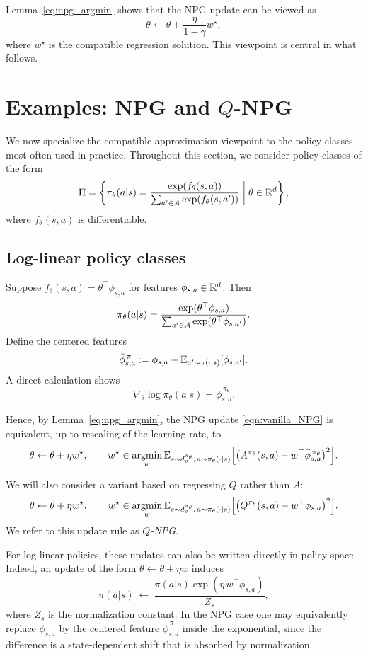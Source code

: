 Lemma~\ref{eq:npg_argmin} shows that the NPG update can be viewed as
\[
\theta \leftarrow \theta + \frac{\eta}{1-\gamma} w^\star,
\]
where $w^\star$ is the compatible regression solution. This viewpoint is central in what
follows.

\section{Examples: NPG and $Q$-NPG}
\label{section:examples}

We now specialize the compatible approximation viewpoint to the policy classes most often
used in practice. Throughout this section, we consider policy classes of the form
\begin{equation}\label{eq:policy_class}
\Pi
=
\left\{
\pi_\theta(a|s)
=
\frac{\exp(f_\theta(s,a))}
{\sum_{a'\in\mathcal{A}}\exp(f_\theta(s,a'))}
\;\middle|\;
\theta\in\mathbb{R}^d
\right\},
\end{equation}
where $f_\theta(s,a)$ is differentiable.

\subsection{Log-linear policy classes}
\label{section:log_linear}

Suppose $f_\theta(s,a)=\theta^\top \phi_{s,a}$ for features $\phi_{s,a}\in\mathbb{R}^d$.
Then
\[
\pi_\theta(a|s)
=
\frac{\exp(\theta^\top \phi_{s,a})}
{\sum_{a'\in\mathcal{A}}\exp(\theta^\top \phi_{s,a'})}.
\]
Define the centered features
\[
\bar \phi_{s,a}^{\,\pi}
:=
\phi_{s,a}-\mathbb{E}_{a'\sim \pi(\cdot|s)}[\phi_{s,a'}].
\]
A direct calculation shows
\[
\nabla_\theta \log \pi_\theta(a|s)=\bar \phi_{s,a}^{\,\pi_\theta}.
\]

Hence, by Lemma~\ref{eq:npg_argmin}, the NPG update
\eqref{eqn:vanilla_NPG} is equivalent, up to rescaling of the learning rate, to
\[
\theta \leftarrow \theta + \eta w^\star,
\qquad
w^\star \in \operatorname*{argmin}_w
\mathbb{E}_{s\sim d_\rho^{\pi_\theta},\,a\sim \pi_\theta(\cdot|s)}
\Big[
\big(A^{\pi_\theta}(s,a)-w^\top \bar \phi_{s,a}^{\,\pi_\theta}\big)^2
\Big].
\]

We will also consider a variant based on regressing $Q$ rather than $A$:
\[
\theta \leftarrow \theta + \eta w^\star,
\qquad
w^\star \in \operatorname*{argmin}_w
\mathbb{E}_{s\sim d_\rho^{\pi_\theta},\,a\sim \pi_\theta(\cdot|s)}
\Big[
\big(Q^{\pi_\theta}(s,a)-w^\top \phi_{s,a}\big)^2
\Big].
\]
We refer to this update rule as \emph{$Q$-NPG}.

For log-linear policies, these updates can also be written directly in policy space.
Indeed, an update of the form $\theta \leftarrow \theta+\eta w$ induces
\[
\pi(a|s)\ \leftarrow\ \frac{\pi(a|s)\exp(\eta\, w^\top \phi_{s,a})}{Z_s},
\]
where $Z_s$ is the normalization constant. In the NPG case one may equivalently replace
$\phi_{s,a}$ by the centered feature $\bar\phi_{s,a}^{\,\pi}$ inside the exponential,
since the difference is a state-dependent shift that is absorbed by normalization.

